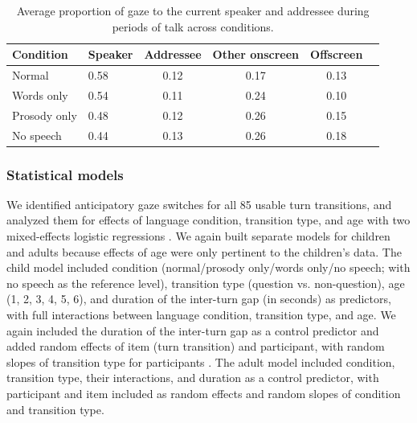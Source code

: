 \documentclass[authoryear, 12pt]{elsarticle}
\begin{document}
\begin{table}[h]
\begin{center}
  \begin{tabular}{llcccc}
    \hline
    Condition & Speaker & Addressee & Other onscreen & Offscreen\\ 
    \hline
    Normal & 0.58 & 0.12 & 0.17 & 0.13 \\ 
    Words only & 0.54 & 0.11 & 0.24 & 0.10 \\ 
    Prosody only & 0.48 & 0.12 & 0.26 & 0.15 \\ 
    No speech & 0.44 & 0.13 & 0.26 & 0.18 \\
    \hline
  \end{tabular}
\end{center}
  \caption{Average proportion of gaze to the current speaker and addressee during periods of talk across conditions.}
\label{tab:look_e2b}
\end{table}


\subsubsection{Statistical models}
\label{sec:models2}

We identified anticipatory gaze switches for all 85 usable turn transitions, and analyzed them for effects of language condition, transition type, and age with two mixed-effects logistic regressions \citep{lme4, R}. We again built separate models for children and adults because effects of age were only pertinent to the children's data. The child model included condition (normal/prosody only/words only/no speech; with no speech as the reference level), transition type (question vs. non-question), age (1, 2, 3, 4, 5, 6), and duration of the inter-turn gap (in seconds) as predictors, with full interactions between language condition, transition type, and age.  We again included the duration of the inter-turn gap as a control predictor and added random effects of item (turn transition) and participant, with random slopes of transition type for participants \citep{barr2013}. The adult model included condition, transition type, their interactions, and duration as a control predictor, with participant and item included as random effects and random slopes of condition and transition type.
\end{document}
